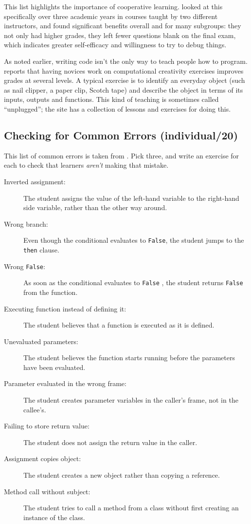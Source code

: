 This list highlights the importance of cooperative learning.
\cite{Beck2013} looked at this specifically over three academic years
in courses taught by two different instructors, and found significant
benefits overall and for many subgroups: they not only had higher
grades, they left fewer questions blank on the final exam, which
indicates greater self-efficacy and willingness to try to debug things.

As noted earlier, writing code isn't the only way to teach people how
to program. \cite{Shel2017} reports that having novices work on
computational creativity exercises improves grades at several
levels. A typical exercise is to identify an everyday object (such as
nail clipper, a paper clip, Scotch tape) and describe the object in
terms of its inputs, outputs and functions. This kind of teaching is
sometimes called ``unplugged''; the  site
has a collection of lessons and exercises for doing this.


\subsection*{Checking for Common Errors (individual/20)}

This list of common errors is taken from \cite{Sirk2012}. Pick three,
and write an exercise for each to check that learners \emph{aren't} making
that mistake.

\begin{description}
\item[Inverted assignment:]
The student assigns the value of the left-hand variable to the
right-hand side variable, rather than the other way around.
\item[Wrong branch:]
Even though the conditional evaluates to \texttt{False}, the student jumps
to the \texttt{then} clause.
\item[Wrong \texttt{False}:]
As soon as the conditional evaluates to \texttt{False} , the student
returns \texttt{False} from the function.
\item[Executing function instead of defining it:]
The student believes that a function is executed as it is defined.
\item[Unevaluated parameters:]
The student believes the function starts running before the
parameters have been evaluated.
\item[Parameter evaluated in the wrong frame:]
The student creates parameter variables in the caller's frame, not
in the callee's.
\item[Failing to store return value:]
The student does not assign the return value in the caller.
\item[Assignment copies object:]
The student creates a new object rather than copying a reference.
\item[Method call without subject:]
The student tries to call a method from a class without first
creating an instance of the class.
\end{description}

